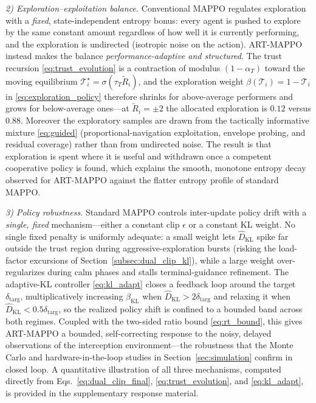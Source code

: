 \documentclass[lettersize,journal]{IEEEtran}
\newcommand{\hladd}[1]{{\color{blue}#1}}
\begin{document}
\hladd{\emph{2) Exploration--exploitation balance.} Conventional MAPPO regulates exploration
with a \emph{fixed}, state-independent entropy bonus: every agent is pushed to explore by the
same constant amount regardless of how well it is currently performing, and the exploration is
undirected (isotropic noise on the action). ART-MAPPO instead makes the balance
\emph{performance-adaptive and structured}. The trust recursion \eqref{eq:trust_evolution} is a
contraction of modulus $(1-\alpha_T)$ toward the moving equilibrium
$\mathcal{T}_i^{\star}=\sigma(\tau_T\tilde{R}_i)$, and the exploration weight
$\beta(\mathcal{T}_i)=1-\mathcal{T}_i$ in \eqref{eq:exploration_policy} therefore shrinks for
above-average performers and grows for below-average ones---at $\tilde{R}_i=\pm2$ the allocated
exploration is $0.12$ versus $0.88$. Moreover the exploratory samples are drawn from the
tactically informative mixture \eqref{eq:guided} (proportional-navigation exploitation, envelope
probing, and residual coverage) rather than from undirected noise. The result is that
exploration is spent where it is useful and withdrawn once a competent cooperative policy is
found, which explains the smooth, monotone entropy decay observed for ART-MAPPO against the
flatter entropy profile of standard MAPPO.}

\hladd{\emph{3) Policy robustness.} Standard MAPPO controls inter-update policy drift with a
\emph{single, fixed} mechanism---either a constant clip $\epsilon$ or a constant KL weight. No
single fixed penalty is uniformly adequate: a small weight lets $\hat{D}_{\mathrm{KL}}$ spike far
outside the trust region during aggressive-exploration bursts (risking the load-factor excursions
of Section~\ref{subsec:dual_clip_kl}), while a large weight over-regularizes during calm phases
and stalls terminal-guidance refinement. The adaptive-KL controller \eqref{eq:kl_adapt} closes a
feedback loop around the target $\delta_{\mathrm{targ}}$, multiplicatively increasing
$\beta_{\mathrm{KL}}$ when $\hat{D}_{\mathrm{KL}}>2\delta_{\mathrm{targ}}$ and relaxing it when
$\hat{D}_{\mathrm{KL}}<0.5\delta_{\mathrm{targ}}$, so the realized policy shift is confined to a
bounded band across both regimes. Coupled with the two-sided ratio bound \eqref{eq:rt_bound}, this
gives ART-MAPPO a bounded, self-correcting response to the noisy, delayed observations of the
interception environment---the robustness that the Monte Carlo and hardware-in-the-loop studies
in Section~\ref{sec:simulation} confirm in closed loop. A quantitative illustration of all three
mechanisms, computed directly from Eqs.~\eqref{eq:dual_clip_final}, \eqref{eq:trust_evolution},
and \eqref{eq:kl_adapt}, is provided in the supplementary response material.}
\end{document}
